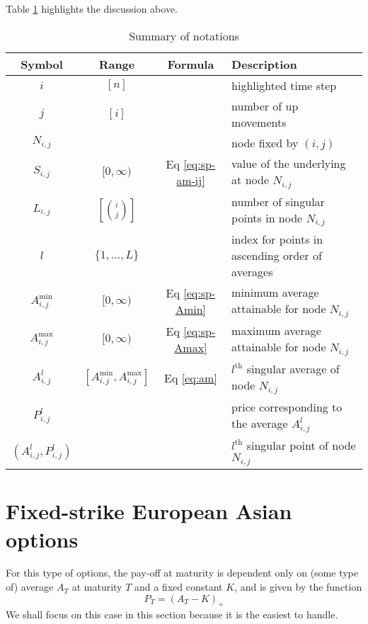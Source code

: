 Table \ref{tab:sp-notation} highlights the discussion above.

\begin{table}
	\label{tab:sp-notations}
	\centering
	\caption{Summary of notations}
	\label{tab:sp-notation}
	\begin{tabular}{cccl}
		\toprule
		Symbol & Range & Formula & Description \\
		\midrule
		$ i $ & $ [ n ] $ & & highlighted time step \\
		$ j $ & $ [ i ] $ & & number of up movements \\
		$ N_{i,j} $ & & & node fixed by $ (i,j) $ \\
		$ S_{i,j} $ & $ [0, \infty) $ & Eq \ref{eq:sp-am-ij} & value of the underlying at node $ N_{i,j} $ \\
		$ L_{i,j} $ & $ \left[ \binom{i}{j} \right] $ & & number of singular points in node $ N_{i,j} $ \\
		$ l $ & $ \{ 1, \dots, L \} $ & & index for points in ascending order of averages \\
		$ A_{i,j}^{\min} $ & $ [0, \infty) $ & Eq \ref{eq:sp-Amin} & minimum average attainable for node $ N_{i,j} $ \\
		$ A_{i,j}^{\max} $ & $ [0, \infty) $ & Eq \ref{eq:sp-Amax} & maximum average attainable for node $ N_{i,j} $ \\
		$ A_{i,j}^l $ & $ \left[ A_{i,j}^{\min}, A_{i,j}^{\max} \right] $ & Eq \ref{eq:am} & $ l^\mathrm{th} $ singular average of node $ N_{i,j} $ \\
		$ P_{i,j}^l $ & & & price corresponding to the average $ A_{i,j}^l $ \\
		$ (A_{i,j}^l, P_{i,j}^l) $ & & & $ l^\mathrm{th} $ singular point of node $ N_{i,j} $ \\
		\bottomrule
	\end{tabular}
\end{table}



\section{Fixed-strike European Asian options}
\label{sec:fixed-strike-eu}

For this type of options, the pay-off at maturity is dependent only on (some type of) average $ A_T $ at maturity $T$ and a fixed constant $K$, and is given by the function
\begin{equation} \label{eq:sp-price-eu-asian-am}
	P_T = (A_T - K)_+
\end{equation}
We shall focus on this case in this section because it is the easiest to handle.

